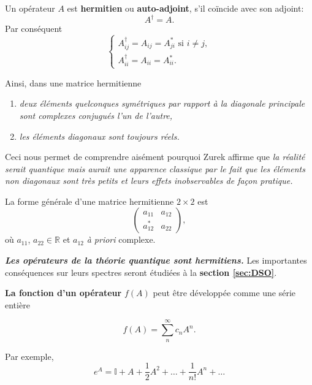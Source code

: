 Un opérateur $A$ est \textbf{hermitien }ou \textbf{auto-adjoint}, s'il
coïncide avec son adjoint:%
\begin{equation}
A^{\dagger}=A.
\end{equation}
Par conséquent%
\begin{equation}
\begin{cases}
A_{ij}^{\dag}=A_{ij}=A_{ji}^{\ast}\text{ si }i\neq j,\\
A_{ii}^{\dag}=A_{ii}=A_{ii}^{\ast}.
\end{cases}
\end{equation}


\colorbox[gray]{0.8}{
\parbox[c]{0.9\textwidth}{
Ainsi, dans une matrice hermitienne

\begin{enumerate}
\item \emph{deux éléments quelconques symétriques par rapport à la diagonale
principale sont complexes conjugués l'un de l'autre,}

\item \emph{les éléments diagonaux sont toujours réels.}
\end{enumerate}
}}\medskip

Ceci nous permet de comprendre aisément pourquoi Zurek affirme que \emph{la
réalité serait quantique mais aurait une apparence classique par le fait que les
éléments non diagonaux sont très petits et leurs effets inobservables de façon
pratique.}

La forme générale d'une matrice hermitienne $2\times2$ est%
\begin{equation}
\begin{pmatrix}
a_{11} & a_{12}\\
a_{12}^{\ast} & a_{22}%
\end{pmatrix} ,
\end{equation}
où $a_{11}$, $a_{22}\in\mathbb{R}$ et $a_{12}$ \emph{à priori} complexe.

\emph{\textbf{Les opérateurs de la théorie quantique sont hermitiens.}} Les
importantes conséquences sur leurs spectres seront étudiées à la
\textbf{section \ref{sec:DSO}}.

\textbf{La fonction d'un opérateur} $f(A)$ peut être développée
comme une série entière%

\begin{equation}
f(A)=\sum_{n}^{\infty}c_{n}A^{n}.
\end{equation}

Par exemple,
\begin{equation}
e^{A}=\mathbb{I}+A+\frac{1}{2}A^{2}+\ldots+\frac{1}{n!}A^{n}+\ldots
\end{equation}


